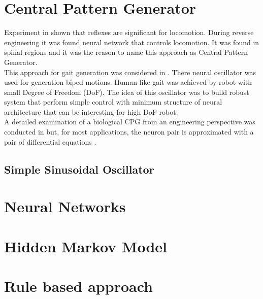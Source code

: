 \documentclass[11pt,a4paper]{report}
\begin{document}
\section{Central Pattern Generator}

Experiment in \cite{grillner1975locomotion} shown that reflexes are significant for locomotion. During reverse engineering it was found neural network that controls locomotion. It was found in spinal regions and it was the reason to name this approach as Central Pattern Generator.\\
This approach for gait generation was considered in \cite{miyakoshi1998three}. There neural oscillator was used for generation biped motions. Human like gait was achieved by robot with small Degree of Freedom (DoF). The idea of this oscillator was to build robust system that perform simple control with minimum structure of neural architecture that can be interesting for high DoF robot.\\
A detailed examination of a biological CPG from an engineering perspective was conducted in \cite{zhu2006central} but, for most applications, the neuron pair is approximated with a pair of differential equations \cite{wright2014intelligent}.

\subsection{Simple Sinusoidal Oscillator}



\section{Neural Networks}
\section{Hidden Markov Model}
\section{Rule based approach}
\newpage
\end{document}
